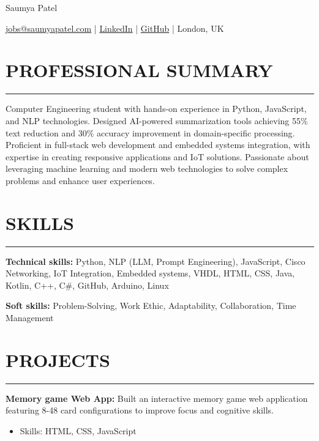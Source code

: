 \documentclass[11pt, letterpaper]{article} %
\newcommand{\resumesection}[1]{%
    \section*{#1}
    \vspace{-8pt}
    \noindent\rule{\textwidth}{0.6pt}
    \vspace{1pt}
    \noindent
}
\begin{document}
\begin{center}
{\fontsize{28}{32}\selectfont Saumya Patel}
\end{center}


\begin{center}
\href{mailto:jobs@saumyapatel.com}{jobs@saumyapatel.com} \quad | \quad \href{https://linkedin.com/in/contact-saumya-patel}{LinkedIn} \quad | \quad \href{https://github.com/Sam6219}{GitHub} \quad | \quad London, UK
\end{center}

\vspace{2pt}

\resumesection{PROFESSIONAL SUMMARY}Computer Engineering student with hands-on experience in Python, JavaScript, and NLP technologies. Designed AI-powered summarization tools achieving 55\% text reduction and 30\% accuracy improvement in domain-specific processing. Proficient in full-stack web development and embedded systems integration, with expertise in creating responsive applications and IoT solutions. Passionate about leveraging machine learning and modern web technologies to solve complex problems and enhance user experiences.

\vspace{6pt}

\resumesection{SKILLS}\textbf{Technical skills:} Python, NLP (LLM, Prompt Engineering), JavaScript, Cisco Networking, IoT Integration, Embedded systems, VHDL, HTML, CSS, Java, Kotlin, C++, C\#, GitHub, Arduino, Linux

\vspace{6pt}

\noindent\textbf{Soft skills:} Problem-Solving, Work Ethic, Adaptability, Collaboration, Time Management

\vspace{6pt}

\resumesection{PROJECTS}\textbf{Memory game Web App:} Built an interactive memory game web application featuring 8-48 card configurations to improve focus and cognitive skills.
\begin{itemize}
    \item Skills: HTML, CSS, JavaScript
\end{itemize}

\vspace{6pt}
\end{document}
